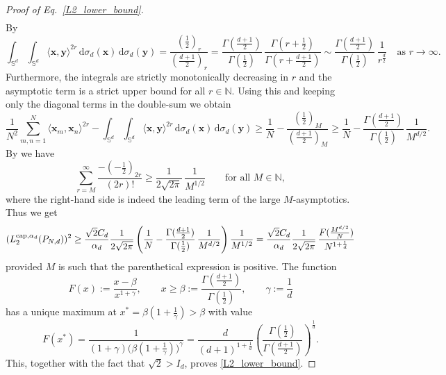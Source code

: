 \documentclass[12pt]{article}
\newcommand{\cp}{{\rm cap}}
\begin{document}
\begin{appendix}
\begin{proof}[Proof of Eq.~\eqref{L2_lower_bound}]
\begin{eqnarray*}
\end{eqnarray*}
By \cite[Lemma~2]{BB25} 
\begin{equation*}
\int_{\mathbb{S}^d} \int_{\mathbb{S}^d} \langle \bm{x}, \bm{y} \rangle^{2r} \,\mathrm{d} \sigma_d(\bm{x}) \,\mathrm{d} \sigma_d(\bm{y})  
=  
\frac{(\frac{1}{2})_{r}}{(\frac{d+1}{2})_{r}} 
=
\frac{\Gamma(\tfrac{d+1}{2})}{\Gamma(\tfrac{1}{2})} \, \frac{\Gamma(r+\tfrac{1}{2})}{\Gamma(r+\tfrac{d+1}{2})}
\sim
\frac{\Gamma( \frac{d+1}{2} )}{\Gamma( \frac{1}{2} )} \, \frac{1}{r^{\frac{d}{2}}} \quad \text{as $r \to \infty$.}    
\end{equation*}
Furthermore, the integrals are strictly monotonically decreasing in $r$ and the asymptotic term is a strict upper bound for all $r\in \mathbb{N}$. Using this and keeping only the diagonal terms in the double-sum we obtain  
\begin{equation*}
\frac{1}{N^2} \sum_{m,n=1}^N \langle \bm{x}_m, \bm{x}_n \rangle^{2r} - \int_{\mathbb{S}^d} \int_{\mathbb{S}^d} \langle \bm{x}, \bm{y} \rangle^{2r} \,\mathrm{d} \sigma_d(\bm{x}) \,\mathrm{d} \sigma_d(\bm{y}) 
\geq 
\frac{1}{N} - \frac{(\frac{1}{2})_{M}}{(\frac{d+1}{2})_{M}} 
\geq 
\frac{1}{N} - \frac{\Gamma( \frac{d+1}{2} )}{\Gamma( \frac{1}{2} )} \, \frac{1}{M^{d/2}}.
\end{equation*}
By \cite[Eq.~(25)]{BB25} we have
\begin{equation*}
\sum_{r=M}^\infty \frac{-(-\frac{1}{2})_{2r}}{(2r)!} 
\geq 
\frac{1}{2 \sqrt{2 \pi}} \, \frac{1}{M^{1/2}} \qquad \mbox{for all } M \in \mathbb{N},
\end{equation*}
where the right-hand side is indeed the leading term of the large $M$-asymptotics. Thus we get 
\begin{equation*}
(L_2^{\cp,\alpha_d}(P_{N,d}))^2  \geq 
\frac{\sqrt{2} C_d}{\alpha_d} \frac{1}{2 \sqrt{2 \pi}}  \left( \frac{1}{N} - \frac{\Gamma( \frac{d+1}{2} )}{\Gamma( \frac{1}{2} )} \, \frac{1}{M^{d/2}} \right) \frac{1}{M^{1/2}} = \frac{\sqrt{2} C_d}{\alpha_d} \frac{1}{2 \sqrt{2 \pi}} \, \frac{F( \frac{M^{d/2}}{N} )}{N^{1+\frac{1}{d}}} 
\end{equation*}
provided $M$ is such that the parenthetical expression is positive. The function 
\begin{equation*}
F(x) := \frac{x - \beta}{x^{1+\gamma}}, \qquad x \geq \beta := \frac{\Gamma( \frac{d+1}{2} )}{\Gamma( \frac{1}{2} )}, \qquad \gamma := \frac{1}{d}
\end{equation*}
has a unique maximum at $x^* = \beta ( 1 + \frac{1}{\gamma} ) > \beta$ with value 
\begin{equation} 
\label{eq:F.x.star}
F(x^*) = \frac{1}{( 1 + \gamma ) \big( \beta ( 1 + \frac{1}{\gamma} ) \big)^{\gamma}}=\frac{d}{(d+1)^{1+\frac{1}{d}}} \left(\frac{\Gamma(\frac{1}{2})}{\Gamma(\frac{d+1}{2})}\right)^{\frac{1}{d}}.
\end{equation}
This, together with the fact that $\sqrt{2}> I_d$, proves \eqref{L2_lower_bound}.
\end{proof}

\end{appendix}
\end{document}
